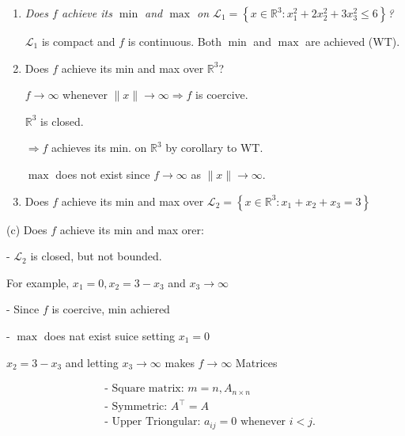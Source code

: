 \documentclass[11pt,a4paper]{article}
\begin{document}
\begin{enumerate}[1)]
    \item \textit{Does $f$ achieve its $\min$ and $\max$ on $\mathcal{L}_{1}=\left\{x \in \mathbb{R}^{3}: x_{1}^{2}+2 x_{2}^{2}+3 x_{3}^{2} \leqslant 6\right\}$?}
    
    $\mathcal{L}_{1}$ is compact and $f$ is continuous. Both $\min$ and $\max$ are achieved (WT).
    \item Does $f$ achieve its min and max over $\mathbb{R}^{3}$?
    
    $f \rightarrow \infty$ whenever $\|x\| \rightarrow \infty \Rightarrow f$ is coercive.

    $\mathbb{R}^{3}$ is closed.

    $\Rightarrow f$ achieves its min. on $\mathbb{R}^{3}$ by corollary to WT.

    $\max$ does not exist since $f \rightarrow \infty$ as $\|x\| \rightarrow \infty$.

    \item Does $f$ achieve its min and max over $\mathscr{L}_{2}=\left\{x \in \mathbb{R}^{3}: x_{1}+x_{2}+x_{3}=3\right\}$
\end{enumerate}

(c) Does $f$ achieve its min and max orer:


- $\mathcal{L}_{2}$ is closed, but not bounded.

For example, $x_{1}=0, x_{2}=3-x_{3}$ and $x_{3} \rightarrow \infty$

- Since $f$ is coercive, min achiered

- $\max$ does nat exist suice setting $x_{1}=0$

$x_{2}=3-x_{3}$ and letting $x_{3} \rightarrow \infty$ makes $f \rightarrow \infty$ Matrices


$$
\begin{aligned}
&\text { - Square matrix: } m=n, A_{n \times n} \\
&\text { - Symmetric: } A^{\top}=A \\
&\text { - Upper Triongular: } a_{i j}=0 \text { whenever } i<j \text {. }
\end{aligned}
$$
\end{document}
